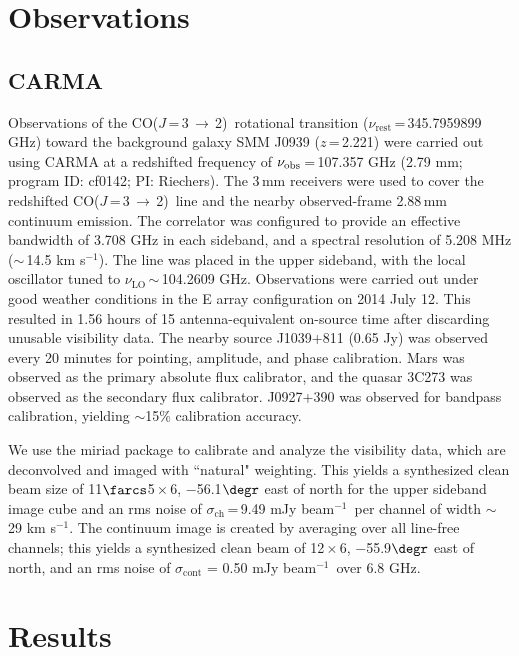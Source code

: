 \documentclass[iop, revtex4]{emulateapj}
\newcommand{\CO}{\mbox{CO($J$\,=\,3\,$\rightarrow$\,2) }}
\newcommand{\pmOne}{\mbox{$^{-1}$}}
\begin{document}
\section{Observations}\label{sec:obs}
\subsection{CARMA} \label{sec:carmadata}
Observations of the \CO rotational transition ($\nu_\textrm{rest}$\,=\,345.7959899 GHz) toward the background galaxy SMM
J0939 ($z$\,=\,2.221) were carried out using CARMA at a redshifted frequency of $\nu_{\rm obs}$\,=\,107.357\,\,GHz (2.79\,\,mm; program ID: cf0142; PI: Riechers). The 3\,mm receivers were used to cover the redshifted \CO line and the nearby observed-frame 2.88\,mm continuum emission. The correlator was configured to provide an effective bandwidth of 3.708 GHz in each sideband, and a spectral resolution of 5.208 MHz ($\sim$\,14.5 km\,\,s\pmOne). 
The line was placed in the
upper sideband, with the local oscillator tuned to $\nu_\textrm{LO}$\,$\sim$\,104.2609 GHz.
Observations were carried out under good
weather conditions in the E array configuration on 2014 July 12. This resulted in 1.56 hours of 15 antenna-equivalent on-source time after discarding unusable visibility data.
The nearby source J1039+811 (0.65\,\,Jy) was observed every 20 minutes for
pointing, amplitude, and phase calibration. Mars was observed as the primary
absolute flux calibrator, and the quasar 3C273 was observed as the secondary
flux calibrator. J0927+390 was observed for bandpass calibration, yielding $\sim
$15\% calibration accuracy. \par
We use the {\sc miriad} package to calibrate and analyze the visibility data, which are deconvolved and imaged with ``natural" weighting.
This yields a synthesized clean beam size of 11$\farcs$5\,$\times$\,6, $-$56.1$\degr$ east of north for the upper sideband image cube and an rms noise of $\sigma_\textrm{ch}$\,=\,9.49\,\,mJy\,\,beam\pmOne\ per channel
of width $\sim$\,29 km\,\,s\pmOne.
The continuum image is created by
averaging over all line-free channels; this yields a synthesized clean beam of 12\,$\times$\,6, $-$55.9$\degr$ east of north, and an rms noise of $\sigma_\textrm{cont}$ = 0.50\,\,mJy\,\,beam\pmOne\ over 6.8 GHz.

\section{Results}\label{sec:res}
\end{document}
